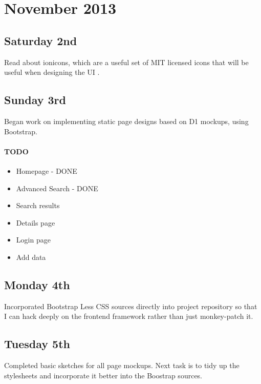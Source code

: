 \section{November 2013 \hrulefill}

\subsection{Saturday 2nd}
Read about ionicons, which are a useful set of MIT licensed icons that will be
useful when designing the UI \cite{Sperry2013}.

\subsection{Sunday 3rd}
Began work on implementing static page designs based on D1 mockups, using
Bootstrap.

\paragraph{TODO}
\begin{itemize}
\item Homepage - DONE
\item Advanced Search - DONE
\item Search results
\item Details page
\item Login page
\item Add data
\end{itemize}

\subsection{Monday 4th}
Incorporated Bootstrap Less CSS sources directly into project repository so that
I can hack deeply on the frontend framework rather than just monkey-patch it.

\subsection{Tuesday 5th}
Completed basic sketches for all page mockups. Next task is to tidy up the
stylesheets and incorporate it better into the Boostrap sources.

